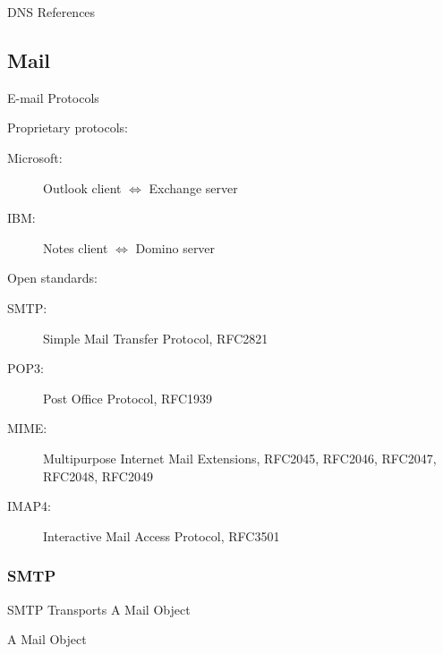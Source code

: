 \begin{frame}{DNS References}
  \begin{refsection}
    \nocite{wiki:dns, rfc1034, rfc1035}
    \printbibliography[heading=none]
  \end{refsection}
\end{frame}

\subsection{Mail}

\begin{frame}{E-mail Protocols}
  \begin{iblock}{Proprietary protocols:}
    \begin{description}
    \item[Microsoft:] Outlook client $\Longleftrightarrow$ Exchange server
    \item[IBM:] Notes client $\Longleftrightarrow$ Domino server
    \end{description}
  \end{iblock}
  \begin{iblock}{Open standards:}
    \begin{description}
    \item[SMTP:] Simple Mail Transfer Protocol, RFC2821
    \item[POP3:] Post Office Protocol, RFC1939
    \item[MIME:] Multipurpose Internet Mail Extensions, RFC2045, RFC2046, RFC2047,
      RFC2048, RFC2049
    \item[IMAP4:] Interactive Mail Access Protocol, RFC3501
    \end{description}
  \end{iblock}
\end{frame}
  
\subsubsection{SMTP}

\begin{frame}{SMTP Transports A Mail Object}
  \begin{iblock}{A Mail Object}
    \begin{center}
    \end{center} \label{fig:mail_obj}
  \end{iblock}  
\end{frame}

